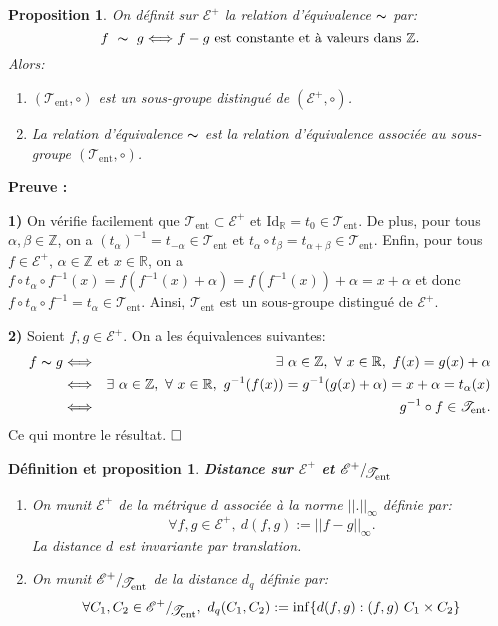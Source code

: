 \documentclass[11pt,a4 paper]{article}
\newtheorem{propriete}[theoreme]{Proposition}
\newtheorem{definitionproposition}[theoreme]{Définition et proposition}
\newcommand{\Rbb}{\mathbb{R}}
\newcommand{\Ec}{\mathcal{E}}
\newcommand{\Id}{\mathrm{Id}}
\newcommand{\Tent}{\mathcal{T}_{\mathrm{ent}}}
\newcommand*{\EnsembleQuotient}[2]%
{\ensuremath{%
		#1/\!\raisebox{-.65ex}{\ensuremath{\mathcal{#2}}}}}
\newenvironment{ppt}{\begin{box_ppt}\begin{propriete}}{\end{propriete}\end{box_ppt}}
\newenvironment{defippt}{\begin{box_defippt}\begin{definitionproposition}}{\end{definitionproposition}\end{box_defippt}}
\begin{document}
\begin{ppt}
	On définit sur $\Ec^+$ la relation d'équivalence $\thicksim$ par: 
	$$f\ \thicksim\ g \Longleftrightarrow f-g \text{ est constante et à valeurs dans\ } \mathbb{Z}.$$
	Alors:
	\begin{enumerate}
		\item $(\Tent, \circ)$ est un sous-groupe distingué de $(\Ec^+,\circ)$.
		\item La relation d'équivalence $\thicksim$ est la relation d'équivalence associée au sous-groupe $(\Tent,\circ)$.
	\end{enumerate}
\end{ppt}
\textbf{Preuve :} 
\par \textbf{1) } On vérifie facilement que $\Tent \subset \Ec^+$ et $\Id_\Rbb=t_0 \in \Tent$. De plus, pour tous $\alpha, \beta \in \mathbb{Z}$, on a $(t_\alpha)^{-1}=t_{-\alpha} \in \Tent$ et $t_\alpha\circ t_\beta=t_{\alpha + \beta} \in \Tent$. Enfin, pour tous $f \in \Ec^+$, $\alpha \in \mathbb{Z}$ et $x \in \Rbb$, on a $f\circ t_\alpha \circ f^{-1}(x)=f(f^{-1}(x)+\alpha)=f(f^{-1}(x))+\alpha=x+\alpha$ et donc $f\circ t_\alpha \circ f^{-1}=t_\alpha \in \Tent$. Ainsi, $\Tent$ est un sous-groupe distingué de $\Ec^+$.\\

\par \textbf{2) }Soient $f,g \in \Ec^+$. On a les équivalences suivantes:
\begin{eqnarray*}
	f \thicksim g &\Longleftrightarrow& \exists\ \alpha \in \mathbb{Z},\ \forall\ x \in \Rbb,\ f(x)=g(x)+\alpha \\
	&\Longleftrightarrow& \exists\ \alpha \in \mathbb{Z},\ \forall\ x \in \Rbb,\ g^{-1}(f(x))=g^{-1}(g(x)+\alpha)=x + \alpha =t_\alpha(x) \\
	&\Longleftrightarrow&g^{-1}\circ f \in \Tent.
\end{eqnarray*}
Ce qui montre le résultat. $\hfill \square$\\











\begin{defippt} \textbf{Distance sur $\Ec^+$ et $\EnsembleQuotient{\mathcal{E}^+}{\Tent}$}\\
	\begin{enumerate}
		\item On munit $\Ec^+$ de la métrique $d$ associée à la norme $||.||_{\infty}$ définie par:
		$$\forall f,g \in \Ec^+,\ d(f,g):=||f-g||_{\infty}.$$
		La distance $d$ est invariante par translation.
		\item On munit $\EnsembleQuotient{\mathcal{E}^+}{\Tent}$ de la distance $d_q$ définie par:
			$$\forall C_1, C_2 \in \EnsembleQuotient{\mathcal{E}^+}{\Tent},\ d_q(C_1,C_2):=\inf\lbrace d(f,g): (f,g)\ C_1 \times C_2\rbrace$$
	\end{enumerate}
\end{defippt}
\end{document}
